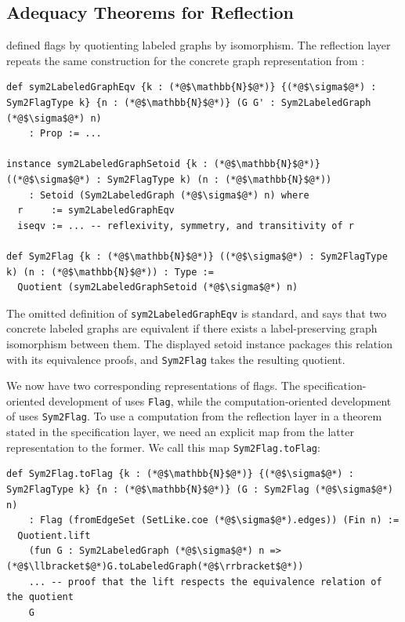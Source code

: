 \documentclass{article}
\newcommand{\lean}[1]{\texttt{#1}}
\begin{document}
\subsection{Adequacy Theorems for Reflection}
\label{sec:reflection-adequacy}

 defined flags by quotienting labeled graphs by
isomorphism.
The reflection layer repeats the same construction for the concrete graph
representation from :
\begin{lstlisting}
def sym2LabeledGraphEqv {k : (*@$\mathbb{N}$@*)} {(*@$\sigma$@*) : Sym2FlagType k} {n : (*@$\mathbb{N}$@*)} (G G' : Sym2LabeledGraph (*@$\sigma$@*) n) 
    : Prop := ...

instance sym2LabeledGraphSetoid {k : (*@$\mathbb{N}$@*)} ((*@$\sigma$@*) : Sym2FlagType k) (n : (*@$\mathbb{N}$@*)) 
    : Setoid (Sym2LabeledGraph (*@$\sigma$@*) n) where
  r     := sym2LabeledGraphEqv
  iseqv := ... -- reflexivity, symmetry, and transitivity of r

def Sym2Flag {k : (*@$\mathbb{N}$@*)} ((*@$\sigma$@*) : Sym2FlagType k) (n : (*@$\mathbb{N}$@*)) : Type :=
  Quotient (sym2LabeledGraphSetoid (*@$\sigma$@*) n)
\end{lstlisting}
The omitted definition of \lean{sym2LabeledGraphEqv} is standard, and says
that two concrete labeled graphs are equivalent if there
exists a label-preserving graph isomorphism between them.
The displayed setoid instance packages this relation with its equivalence
proofs, and \lean{Sym2Flag} takes the resulting quotient.

We now have two corresponding representations of flags.  The
specification-oriented development of  uses
\lean{Flag}, while the computation-oriented development
of  uses
\lean{Sym2Flag}.  To use a computation from the reflection layer in a theorem
stated in the
specification layer, we need an explicit map from the latter representation to
the former.  We call this map \lean{Sym2Flag.toFlag}:
\begin{lstlisting}
def Sym2Flag.toFlag {k : (*@$\mathbb{N}$@*)} {(*@$\sigma$@*) : Sym2FlagType k} {n : (*@$\mathbb{N}$@*)} (G : Sym2Flag (*@$\sigma$@*) n) 
    : Flag (fromEdgeSet (SetLike.coe (*@$\sigma$@*).edges)) (Fin n) :=
  Quotient.lift
    (fun G : Sym2LabeledGraph (*@$\sigma$@*) n => (*@$\llbracket$@*)G.toLabeledGraph(*@$\rrbracket$@*))
    ... -- proof that the lift respects the equivalence relation of the quotient
    G
\end{lstlisting}
\end{document}

